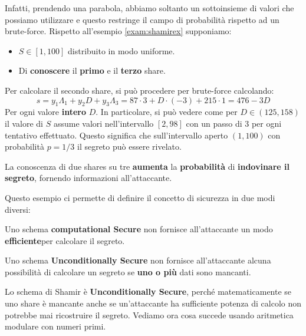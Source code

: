 Infatti, prendendo una parabola, abbiamo soltanto un sottoinsieme di valori che possiamo utilizzare e questo restringe il campo di probabilità rispetto ad un brute-force. Rispetto all'esempio \ref{exam:shamirex} supponiamo:
\begin{itemize}
    \item $S\in [1,100]$ distribuito in modo uniforme.
    \item Di \textbf{conoscere} il \textbf{primo} e il \textbf{terzo} share.
\end{itemize}
Per calcolare il secondo share, si può procedere per brute-force calcolando:
\[
s=y_1\Lambda_1+y_2D+y_3\Lambda_3=87\cdot3+D\cdot(-3)+215\cdot1=476-3D
\]
Per ogni valore \textbf{intero} $D$. In particolare, si può vedere come per $D\in(125,158)$ il valore di $S$ assume valori nell'intervallo $[2,98]$ con un passo di $3$ per ogni tentativo effettuato. Questo significa che sull'intervallo aperto $(1,100)$ con probabilità $p=1/3$ il segreto può essere rivelato.
\begin{remark}
La conoscenza di due shares su tre \textbf{aumenta} la \textbf{probabilità} di \textbf{indovinare il segreto}, fornendo informazioni all'attaccante.
\end{remark}
Questo esempio ci permette di definire il concetto di sicurezza in due modi diversi:
\begin{definition}
Uno schema \textbf{computational Secure} non fornisce all'attaccante un modo \textbf{efficiente}\footnotemark per calcolare il segreto.
\end{definition}
\begin{definition}
Uno schema \textbf{Unconditionally Secure} non fornisce all'attaccante alcuna possibilità di calcolare un segreto se \textbf{uno o più} dati sono mancanti.
\end{definition}
Lo schema di Shamir è \textbf{Unconditionally Secure}, perché matematicamente se uno share è mancante anche se un'attaccante ha sufficiente potenza di calcolo non potrebbe mai ricostruire il segreto. Vediamo ora cosa succede usando aritmetica modulare con numeri primi.
